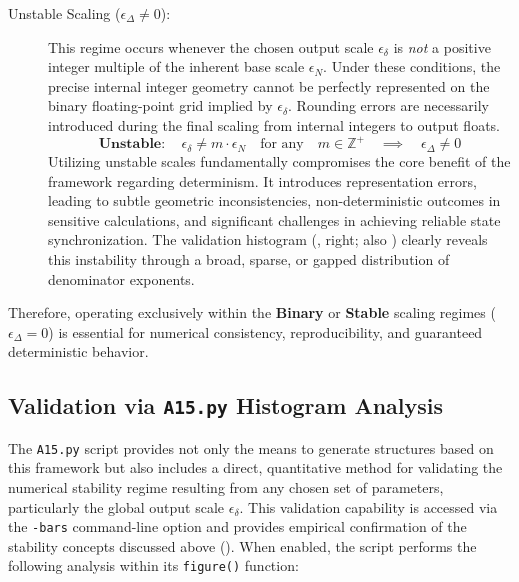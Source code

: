 \documentclass[10pt]{article}
\begin{document}
\begin{description}
    \item[Unstable Scaling ($\epsilon_\Delta \neq 0$):] This regime occurs whenever the chosen output scale $\epsilon_\delta$ is \emph{not} a positive integer multiple of the inherent base scale $\epsilon_N$. Under these conditions, the precise internal integer geometry cannot be perfectly represented on the binary floating-point grid implied by $\epsilon_\delta$. Rounding errors are necessarily introduced during the final scaling from internal integers to output floats.
    \begin{equation}\label{eq:scaling-unstable}
    \textbf{Unstable}: \quad \epsilon_\delta \neq m \cdot \epsilon_N \quad \text{for any} \quad m \in \mathbb{Z}^+ \quad \implies \quad \epsilon_\Delta \neq 0
    \end{equation}
    Utilizing unstable scales fundamentally compromises the core benefit of the framework regarding determinism. It introduces representation errors, leading to subtle geometric inconsistencies, non-deterministic outcomes in sensitive calculations, and significant challenges in achieving reliable state synchronization. The validation histogram (, right; also ) clearly reveals this instability through a broad, sparse, or gapped distribution of denominator exponents.
\end{description}
Therefore, operating exclusively within the \textbf{Binary} or \textbf{Stable} scaling regimes ($\epsilon_\Delta = 0$) is essential for numerical consistency, reproducibility, and guaranteed deterministic behavior.

\subsection{Validation via \texttt{A15.py} Histogram Analysis}\label{subsec:stability-validation}

The \texttt{A15.py} script provides not only the means to generate structures based on this framework but also includes a direct, quantitative method for validating the numerical stability regime resulting from any chosen set of parameters, particularly the global output scale $\epsilon_\delta$. This validation capability is accessed via the \texttt{-bars} command-line option and provides empirical confirmation of the stability concepts discussed above (). When enabled, the script performs the following analysis within its \texttt{figure()} function:
\end{document}
